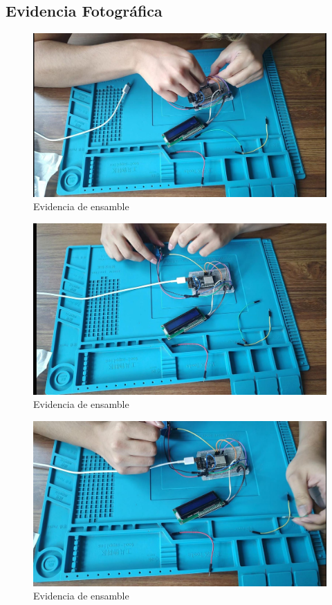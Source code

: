     \subsection{Evidencia Fotográfica}
    
    \begin{figure}[H]
        \centering
        \includegraphics[trim = {10mm 10mm 10mm 10mm},clip,scale=0.2]{25/img/ensamble1.pdf}
        \caption{Evidencia de ensamble}
        \label{fig:Ensamble 1}
    \end{figure}
    \begin{figure}[H]
        \centering
        \includegraphics[trim = {10mm 10mm 10mm 10mm},clip,scale=0.2]{25/img/ensamble2.pdf}
        \caption{Evidencia de ensamble}
        \label{fig:Ensamble 2}
    \end{figure}
    \begin{figure}[H]
        \centering
        \includegraphics[trim = {10mm 10mm 10mm 10mm},clip,scale=0.2]{25/img/ensamble3.pdf}
        \caption{Evidencia de ensamble}
        \label{fig:Ensamble 3}
    \end{figure}

